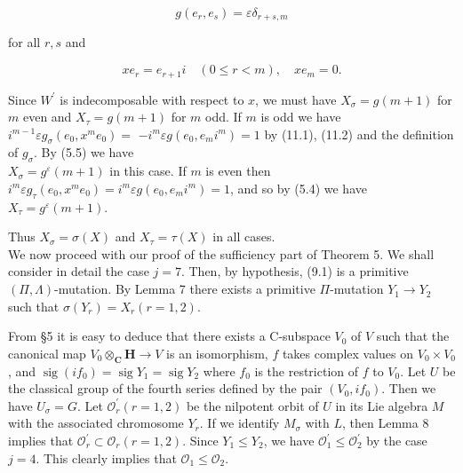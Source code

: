 \documentclass[10pt]{article}
\begin{document}
\begin{equation*}
g\left(e_{r}, e_{s}\right)=\varepsilon \delta_{r+s, m} \tag{11.1}
\end{equation*}


for all $r, s$ and


\begin{equation*}
x e_{r}=e_{r+1} i \quad(0 \leqslant r<m), \quad x e_{m}=0 . \tag{11.2}
\end{equation*}


Since $W^{\prime}$ is indecomposable with respect to $x$, we must have $X_{\sigma}=g(m+1)$ for $m$ even and $X_{\tau}=g(m+1)$ for $m$ odd. If $m$ is odd we have $i^{m-1} \varepsilon g_{\sigma}\left(e_{0}, x^{m} e_{0}\right)=$ $-i^{m} \varepsilon g\left(e_{0}, e_{m} i^{m}\right)=1$ by (11.1), (11.2) and the definition of $g_{\sigma}$. By (5.5) we have\\
$X_{\sigma}=g^{\varepsilon}(m+1)$ in this case. If $m$ is even then $i^{m} \varepsilon g_{\tau}\left(e_{0}, x^{m} e_{0}\right)=i^{m} \varepsilon g\left(e_{0}, e_{m} i^{m}\right)=1$, and so by (5.4) we have $X_{\tau}=g^{\varepsilon}(m+1)$.

Thus $X_{\sigma}=\sigma(X)$ and $X_{\tau}=\tau(X)$ in all cases.\\
We now proceed with our proof of the sufficiency part of Theorem 5. We shall consider in detail the case $j=7$. Then, by hypothesis, (9.1) is a primitive $(\Pi, \Lambda)$-mutation. By Lemma 7 there exists a primitive $\Pi$-mutation $Y_{1} \rightarrow Y_{2}$ such that $\sigma\left(Y_{r}\right)=X_{r}(r=1,2)$.

From §5 it is easy to deduce that there exists a C-subspace $V_{0}$ of $V$ such that the canonical map $V_{0} \otimes_{\mathbf{C}} \mathbf{H} \rightarrow V$ is an isomorphism, $f$ takes complex values on $V_{0} \times V_{0}$, and $\operatorname{sig}\left(i f_{0}\right)=\operatorname{sig} Y_{1}=\operatorname{sig} Y_{2}$ where $f_{0}$ is the restriction of $f$ to $V_{0}$. Let $U$ be the classical group of the fourth series defined by the pair $\left(V_{0}, i f_{0}\right)$. Then we have $U_{\sigma}=G$. Let $\mathcal{O}_{r}^{\prime}(r=1,2)$ be the nilpotent orbit of $U$ in its Lie algebra $M$ with the associated chromosome $Y_{r}$. If we identify $M_{\sigma}$ with $L$, then Lemma 8 implies that $\mathcal{O}_{r}^{\prime} \subset \mathcal{O}_{r}(r=1,2)$. Since $Y_{1} \leqslant Y_{2}$, we have $\mathcal{O}_{1}^{\prime} \leqslant \mathcal{O}_{2}^{\prime}$ by the case $j=4$. This clearly implies that $\mathcal{O}_{1} \leqslant \mathcal{O}_{2}$.
\end{document}
